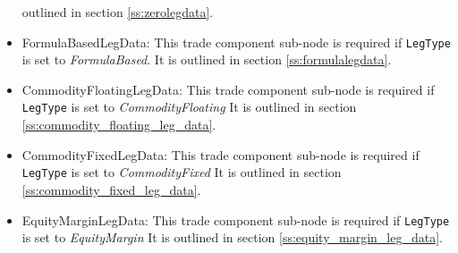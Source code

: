 \begin{itemize}
  outlined in section \ref{ss:zerolegdata}.
  \item FormulaBasedLegData: This trade component sub-node is required if \lstinline!LegType! is set to \emph{FormulaBased}. It is
  outlined in section \ref{ss:formulalegdata}.
  \item CommodityFloatingLegData: This trade component sub-node is required if \lstinline!LegType! is set to \emph{CommodityFloating} It is
outlined in section \ref{ss:commodity_floating_leg_data}.
\item CommodityFixedLegData: This trade component sub-node is required if \lstinline!LegType! is set to \emph{CommodityFixed} It is outlined in section \ref{ss:commodity_fixed_leg_data}.
\item EquityMarginLegData: This trade component sub-node is required if \lstinline!LegType! is set to \emph{EquityMargin} It is outlined in section \ref{ss:equity_margin_leg_data}.
\end{itemize}
